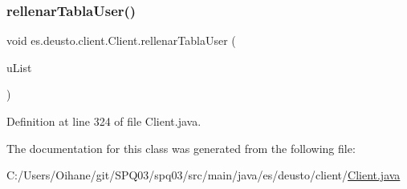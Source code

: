 \subsubsection{\texorpdfstring{rellenar\+Tabla\+User()}{rellenarTablaUser()}}
{\footnotesize\ttfamily void es.\+deusto.\+client.\+Client.\+rellenar\+Tabla\+User (\begin{DoxyParamCaption}\item[{Array\+List$<$ \hyperlink{classes_1_1deusto_1_1server_1_1db_1_1data_1_1_user}{User} $>$}]{u\+List }\end{DoxyParamCaption})}



Definition at line 324 of file Client.\+java.



The documentation for this class was generated from the following file\+:\begin{DoxyCompactItemize}
\item 
C\+:/\+Users/\+Oihane/git/\+S\+P\+Q03/spq03/src/main/java/es/deusto/client/\hyperlink{_client_8java}{Client.\+java}\end{DoxyCompactItemize}
